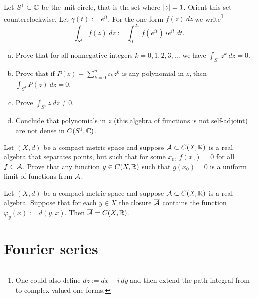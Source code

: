 \begin{exercise} \label{exercise:selfadjointSW}
Let $S^1 \subset {\mathbb{C}}$ be the unit circle, that is the set where
$\lvert {z} \rvert = 1$.  Orient this set counterclockwise.
Let $\gamma(t) := e^{it}$.
For the one-form $f(z)~dz$ we write\footnote{%
One could also define $dz := dx + i \, dy$ and then
extend the path integral from  to complex-valued
one-forms.}
\begin{equation*}
\int_{S^1} f(z) ~dz := \int_0^{2\pi} f(e^{it}) \, i e^{it} ~ dt . 
\end{equation*}
\begin{enumerate}[a)]
\item
Prove that for all nonnegative integers $k = 0,1,2,3,\ldots$ we have
$\int_{S^1} z^k ~ dz = 0$.
\item
Prove that if
$P(z) = \sum_{k=0}^n c_k z^k$ is any
polynomial in $z$, then
$\int_{S^1} P(z) ~ dz = 0$.
\item
Prove
$\int_{S^1} \bar{z} ~ dz \not= 0$.
\item
Conclude that polynomials in $z$ (this algebra of functions is
not self-adjoint) are not dense in $C(S^1,{\mathbb{C}})$.
\end{enumerate}
\end{exercise}

\begin{exercise}
Let $(X,d)$ be a compact metric space and
suppose ${\mathcal{A}} \subset C(X,{\mathbb{R}})$ is a real algebra that separates points, but
such that for some $x_0$, $f(x_0) = 0$ for all $f \in {\mathcal{A}}$.  Prove that
any function $g \in C(X,{\mathbb{R}})$ such that $g(x_0) = 0$ is a uniform limit
of functions from ${\mathcal{A}}$.
\end{exercise}

\begin{exercise}
Let $(X,d)$ be a compact metric space and
suppose ${\mathcal{A}} \subset C(X,{\mathbb{R}})$ is a real algebra.
Suppose that for each $y \in X$ the closure $\overline{{\mathcal{A}}}$
contains the function $\varphi_y(x) := d(y,x)$.
Then $\overline{{\mathcal{A}}} = C(X,{\mathbb{R}})$.
\end{exercise}


\sectionnewpage
\section{Fourier series}
\label{sec:fourier}


